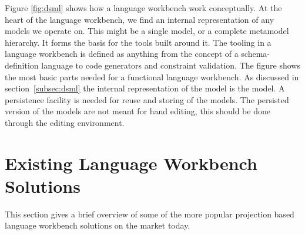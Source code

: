 Figure \ref{fig:dsml} shows how a language workbench work conceptually. At the heart of the language workbench, we find an internal representation of any models we operate on. This might be a single model, or a complete metamodel hierarchy. It forms the basis for the tools built around it. The tooling in a language workbench is defined as anything from the concept of a schema-definition language to code generators and constraint validation. The figure shows the most basic parts needed for a functional language workbench. As discussed in section~\ref{subsec:dsml} the internal representation of the model is the model. A persistence facility is needed for reuse and storing of the models. The persisted version of the models are not meant for hand editing, this should be done through the editing environment. 



\section{Existing Language Workbench Solutions} 
This section gives a brief overview of some of the more popular projection based language workbench solutions on the market today. 

